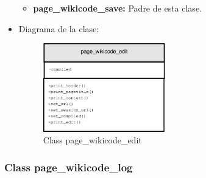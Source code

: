 \begin{itemize}
\begin{itemize}
			\item \textbf{page\_wikicode\_save:} Padre de esta clase.
		\end{itemize}
	\item Diagrama de la clase:
		\begin{figure}[h]
			\centering
			\includegraphics[width=0.5\textwidth]{./img/page_wikicode_edit.eps}
			\caption{Class page\_wikicode\_edit}
		\end{figure}
\end{itemize}

\subsubsection{Class page\_wikicode\_log}


